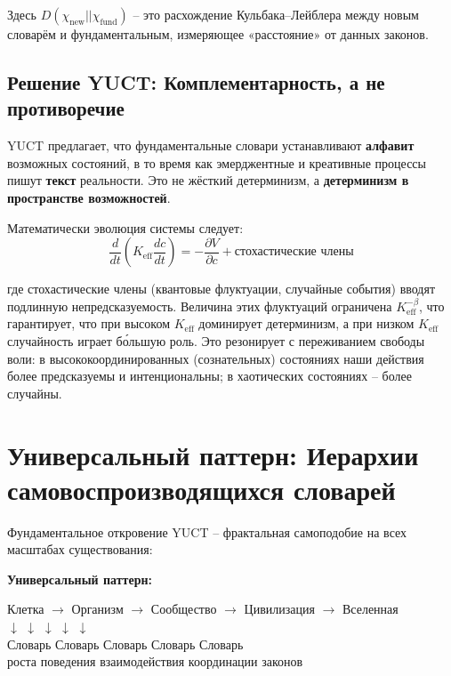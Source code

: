\documentclass[12pt,a4paper]{article}
\newcommand{\eff}{\mathrm{eff}}
\newcommand{\Ke}{K_{\eff}}
\begin{document}
	Здесь $D(\chi_{\text{new}} || \chi_{\text{fund}})$ – это расхождение Кульбака–Лейблера между новым словарём и фундаментальным, измеряющее «расстояние» от данных законов.
	
	\subsection{Решение YUCT: Комплементарность, а не противоречие}
	
	YUCT предлагает, что фундаментальные словари устанавливают \textbf{алфавит} возможных состояний, в то время как эмерджентные и креативные процессы пишут \textbf{текст} реальности. Это не жёсткий детерминизм, а \textbf{детерминизм в пространстве возможностей}.
	
	Математически эволюция системы следует:
	\[
	\frac{d}{dt}\left( \Ke \frac{dc}{dt} \right) = -\frac{\partial V}{\partial c} + \text{стохастические члены}
	\]
	
	где стохастические члены (квантовые флуктуации, случайные события) вводят подлинную непредсказуемость. Величина этих флуктуаций ограничена $\Ke^{-\beta}$, что гарантирует, что при высоком $\Ke$ доминирует детерминизм, а при низком $\Ke$ случайность играет бо́льшую роль. Это резонирует с переживанием свободы воли: в высококоординированных (сознательных) состояниях наши действия более предсказуемы и интенциональны; в хаотических состояниях – более случайны.
	
	\section{Универсальный паттерн: Иерархии самовоспроизводящихся словарей}
	
	Фундаментальное откровение YUCT – фрактальная самоподобие на всех масштабах существования:
	
	\textbf{Универсальный паттерн:}
	\begin{center}
		Клетка $\to$ Организм $\to$ Сообщество $\to$ Цивилизация $\to$ Вселенная\\
		$\downarrow$ \hspace{1cm} $\downarrow$ \hspace{1.2cm} $\downarrow$ \hspace{1.2cm} $\downarrow$ \hspace{1.2cm} $\downarrow$\\
		Словарь \hspace{0.5cm} Словарь \hspace{0.5cm} Словарь \hspace{0.5cm} Словарь \hspace{0.5cm} Словарь\\
		роста \hspace{0.2cm} поведения \hspace{0.1cm} взаимодействия \hspace{0.1cm} координации \hspace{0.1cm} законов
	\end{center}
	
\end{document}
